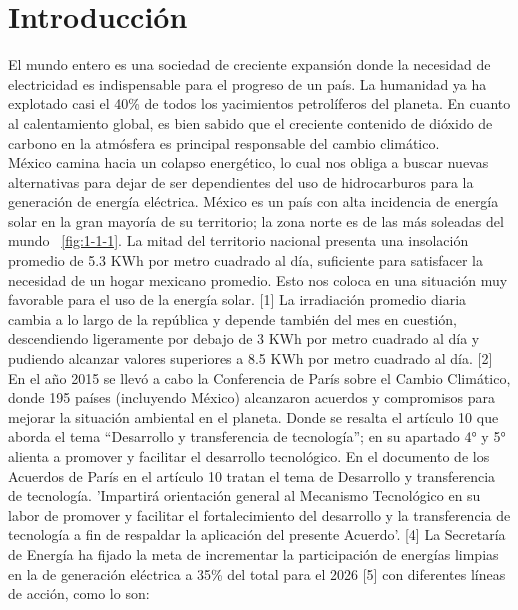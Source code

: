 \chapter{Introducci\'on} %

El mundo entero es una sociedad de creciente expansión donde la necesidad de electricidad es indispensable para el progreso de un país. La humanidad ya ha explotado casi el 40\% de todos los yacimientos petrolíferos del planeta. En cuanto al calentamiento global, es bien sabido que el creciente contenido de dióxido de carbono en la atmósfera es principal responsable del cambio climático. \\
 
México camina hacia un colapso energético, lo cual nos obliga a buscar nuevas alternativas para dejar de ser
dependientes del uso de hidrocarburos para la generación de energía eléctrica. México es un país con alta incidencia de energía solar en la gran mayoría de su territorio; la zona norte es de las más soleadas del mundo ~\ref{fig:1-1-1}. La mitad del territorio nacional presenta una insolación promedio de 5.3 KWh por metro cuadrado al día, suficiente para satisfacer la necesidad de un hogar mexicano promedio. Esto nos coloca en una situación muy favorable para el uso de la energía solar. [1] La irradiación promedio diaria cambia a lo largo de la república y depende también del mes en cuestión, descendiendo ligeramente por debajo de 3 KWh por metro cuadrado al día y pudiendo alcanzar valores superiores a 8.5 KWh por metro cuadrado al día. [2] \\


En el año 2015 se llevó a cabo la Conferencia de París sobre el Cambio Climático, donde 195 países (incluyendo México)
alcanzaron acuerdos y compromisos para mejorar la situación ambiental en el planeta. Donde se resalta el artículo 10 que aborda el tema “Desarrollo y transferencia de tecnología”; en su apartado 4° y 5° alienta a promover y facilitar el desarrollo tecnológico. En el documento de los Acuerdos de París en el artículo 10 tratan el tema de Desarrollo y transferencia de tecnología.
'Impartirá orientación general al Mecanismo Tecnológico en su labor de promover y facilitar el fortalecimiento del desarrollo y la transferencia de tecnología a fin de respaldar la aplicación del presente Acuerdo'. [4]
La Secretaría de Energía ha fijado la meta de incrementar la participación de energías limpias en la de generación eléctrica a 35\% del total para el 2026 [5] con diferentes líneas de acción, como lo son:


